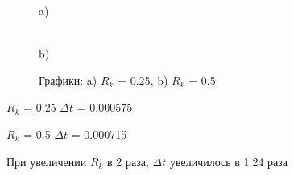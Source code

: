 \begin{figure}[H]
\begin{minipage}[h]{0.47\linewidth}
 a) \\
\end{minipage}
\hfill
\begin{minipage}[h]{0.47\linewidth}
 \\b)
\end{minipage}
\caption{Графики: a) $R_k$  = 0.25, b)
$R_k$  = 0.5}
\label{fig:fig10}
\end{figure}

$R_k$  = 0.25 $\Delta t$ = 0.000575

$R_k$  = 0.5 $\Delta t$ = 0.000715

При увеличении $R_k$ в 2 раза, $\Delta t$ увеличилось в 1.24 раза



